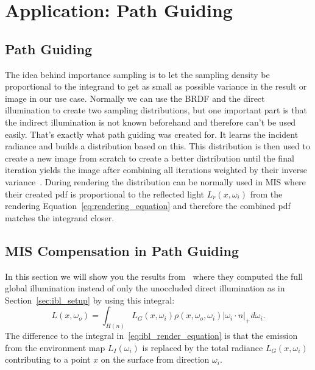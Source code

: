\chapter{Application: Path Guiding}
\label{ch:application_pg}


\section{Path Guiding}
\label{sec:path_guiding}
The idea behind importance sampling is to let the sampling density be proportional to the integrand
to get as small as possible variance in the result or image in our use case.
Normally we can use the BRDF and the direct illumination to create two sampling distributions,
but one important part is that the indirect illumination is not known beforehand and therefore can't be used easily.
That's exactly what path guiding was created for.
It learns the incident radiance and builds a distribution based on this.
This distribution is then used to create a new image from scratch to create a better distribution
until the final iteration yields the image after combining all iterations weighted by their inverse variance~\cite{Vorba_2019}.
During rendering the distribution can be normally used in MIS
where their created pdf is proportional to the reflected light $ L_r(x, \omega_i) $ from the rendering Equation~\ref{eq:rendering_equation}
and therefore the combined pdf matches the integrand closer.


\section{MIS Compensation in Path Guiding}
\label{sec:misc_path_guiding}
In this section we will show you the results from~\cite[Section~8-9]{Karlik2019}
where they computed the full global illumination instead of only the unoccluded direct illumination as in Section~\ref{sec:ibl_setup} by using this integral:
$$ L(x, \omega_o) = \int_{H(n)} L_G(x, \omega_i)\rho(x, \omega_o, \omega_i) |\omega_i \cdot n|_+ d\omega_i. $$
The difference to the integral in~\ref{eq:ibl_render_equation} is that the emission from the environment map $ L_I(\omega_i) $
is replaced by the total radiance $ L_G(x, \omega_i) $ contributing to a point $ x $ on the surface from direction $ \omega_i $.

